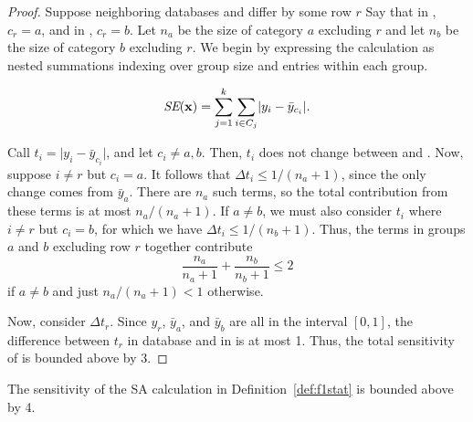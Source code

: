 \begin{proof}

Suppose neighboring databases \x and \xprime differ by some row $r$ %
Say that in \x, $c_r = a$, and in \xprime, $c_r = b$. 
Let $n_a$ be the size of category $a$ excluding $r$ and let $n_b$ be the size of category $b$ excluding $r$. We begin by expressing the \se calculation as nested summations indexing over group size and entries within each group.

$$ \textit{SE}(\mathbf{x}) = \sum_{j=1}^k \sum_{i \in C_j}  \lvert y_{i} - \bar{y}_{c_i} \rvert. $$

Call $t_{i} = \lvert y_{i} - \bar{y}_{c_i} \rvert$, and let $c_i \neq a,b$. Then, $t_{i}$ does not change between \x and \xprime. Now, suppose $i \ne r$ but $c_i = a$. It follows that $\Delta t_{i} \le 1/(n_a+1)$, since the only change comes from $\bar{y}_{a}$. There are $n_a$ such terms, so the total contribution from these terms is at most $n_a/(n_a+1)$. If $a \neq b$, we must also consider $t_{i}$ where $i \ne r$ but $c_i = b$, for which we have $\Delta t_{i} \le 1/(n_b+1)$. Thus, the terms in groups $a$ and $b$ excluding row $r$ together contribute 
$$ \frac{n_a}{n_a+1} + \frac{n_b}{n_b+1} \leq 2$$
if $a \neq b$ and just $n_a / (n_a+1) < 1$ otherwise.

Now, consider $\Delta t_{r}$. Since $y_{r}$, $\bar{y}_{a}$, and $\bar{y}_b$ are all in the interval $[0,1]$, the difference between $t_{r}$ in database \x and in \xprime is at most 1. Thus, the total sensitivity of \se is bounded above by 3.

\end{proof}


\begin{theorem}[SA Sensitivity] \label{thm:SAsens}
The sensitivity of the SA calculation in Definition~\ref{def:f1stat} is bounded above by 4. 
\end{theorem}

